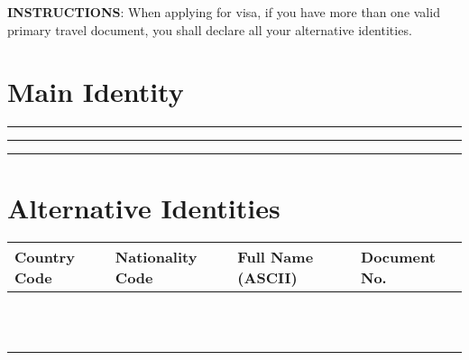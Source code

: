 




\begin{minipage}{\textwidth}
	\small
	\textbf{INSTRUCTIONS}:
	\inlinelistitem When applying for visa, if you have more than one valid primary travel document, you shall declare all your alternative identities.
\end{minipage}


\section*{Main Identity}

\par\vskip 9pt\hrule
{}%
\par\vskip 9pt\hrule
{}%
%
\par\vskip 9pt\hrule

\section*{Alternative Identities}

\tabulinesep=15pt
\begin{tabu}{|l|l|X[2]|X|}
	\hline
	Country Code & Nationality Code & Full Name (ASCII) & Document No. \\
	\hline
	{}           & {}               & {}                & {}           \\
	\hline
	{}           & {}               & {}                & {}           \\
	\hline
	{}           & {}               & {}                & {}           \\
	\hline
	{}           & {}               & {}                & {}           \\
	\hline
	{}           & {}               & {}                & {}           \\
	\hline
	{}           & {}               & {}                & {}           \\
	\hline
	{}           & {}               & {}                & {}           \\
	\hline
	{}           & {}               & {}                & {}           \\
	\hline
	{}           & {}               & {}                & {}           \\
	\hline
	{}           & {}               & {}                & {}           \\
	\hline
	{}           & {}               & {}                & {}           \\
	\hline
\end{tabu}







